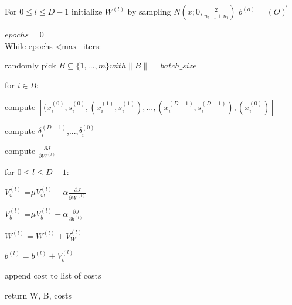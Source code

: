 For $0\leq {l} \leq D-1$ initialize $W^{(l)}$ by sampling $N(x;0,\frac{2}{n_{l-1}+n_{l}})$
$b^{(o)} = \vec{(O)}$


$epochs = 0$\\

While epochs \textless{max\_iters}:

\hspace{0.5cm}randomly pick $B\subseteq \{1,...,m\} with \|B\| = batch\_size$

\hspace{0.5cm}for $i \in B$:

\hspace{1cm}compute $[(x_{i}^{(0)},s_{i}^{(0)},(x_{i}^{(1)},s_{i}^{(1)}),...,(x_{i}^{(D-1)},s_{i}^{(D-1)}),(x_{i}^{(0)})]$

\hspace{1cm}compute $\delta_{i}^{(D-1)}$,...,$\delta_{i}^{(0)}$

\hspace{0.5cm}compute $\frac{\partial{J}}{\partial{W}^{(l)}}$

\hspace{0.5cm}for $0\leq l \leq D-1$:

\hspace{1cm} $V_{w}^{(l)}$ =$ \mu V_{w}^{(l)}-\alpha \frac{\partial{J}}{\partial{W}^{(l)}}$

\hspace{1cm} $V_{b}^{(l)}$ =$ \mu V_{b}^{(l)}-\alpha \frac{\partial{J}}{\partial{b}^{(l)}}$

\hspace{1cm} $W^{(l)} = W^{(l)} + V_{W}^{(l)}$

\hspace{1cm} $b^{(l)} = b^{(l)} + V_{b}^{(l)}$

\hspace{0.5cm}append cost to list of costs

return W, B, costs

